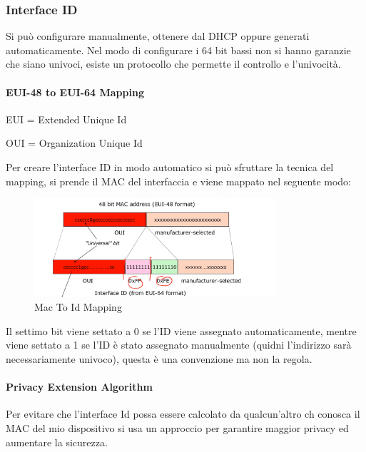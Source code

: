 \documentclass[12pt]{article}
\begin{document}
\subsubsection{Interface ID}
Si pu\`o configurare manualmente, ottenere dal DHCP oppure generati automaticamente. Nel modo di configurare i 64 bit bassi non si hanno garanzie che siano univoci, esiste un protocollo che permette il controllo e l'univocit\`a.

\paragraph{EUI-48 to EUI-64 Mapping}
EUI = Extended Unique Id

OUI = Organization Unique Id

Per creare l'interface ID in modo automatico si pu\`o sfruttare la tecnica del mapping, si prende il MAC del interfaccia e viene mappato nel seguente modo:
\begin{figure}[H]
    \centering
    \includegraphics[width=0.8\textwidth]{mac-to-id-mapping.png}
    \caption{Mac To Id Mapping}
    \label{fig:mac-to-id-mapping}
\end{figure}
Il settimo bit viene settato a 0 se l'ID viene assegnato automaticamente, mentre viene settato a 1 se l'ID \`e stato assegnato manualmente (quidni l'indirizzo sar\`a necessariamente univoco), questa \`e una convenzione ma non la regola.

\paragraph{Privacy Extension Algorithm}
Per evitare che l'interface Id possa essere calcolato da qualcun'altro ch conosca il MAC del mio dispositivo si usa un approccio per garantire maggior privacy ed aumentare la sicurezza.
\end{document}
